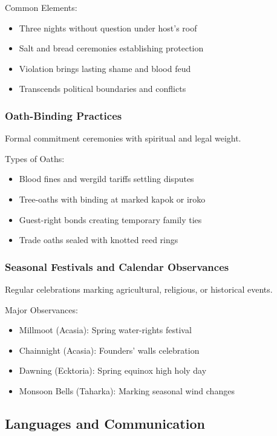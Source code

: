 Common Elements:
\begin{itemize}
    \item Three nights without question under host's roof
    \item Salt and bread ceremonies establishing protection
    \item Violation brings lasting shame and blood feud
    \item Transcends political boundaries and conflicts
\end{itemize}

\subsubsection{Oath-Binding Practices}
\label{sec:oaths}

Formal commitment ceremonies with spiritual and legal weight.

Types of Oaths:
\begin{itemize}
    \item Blood fines and wergild tariffs settling disputes
    \item Tree-oaths with binding at marked kapok or iroko
    \item Guest-right bonds creating temporary family ties
    \item Trade oaths sealed with knotted reed rings
\end{itemize}

\subsubsection{Seasonal Festivals and Calendar Observances}
\label{sec:festivals}

Regular celebrations marking agricultural, religious, or historical events.

Major Observances:
\begin{itemize}
    \item Millmoot (Acasia): Spring water-rights festival
    \item Chainnight (Acasia): Founders' walls celebration
    \item Dawning (Ecktoria): Spring equinox high holy day
    \item Monsoon Bells (Taharka): Marking seasonal wind changes
\end{itemize}

\subsection{Languages and Communication}

